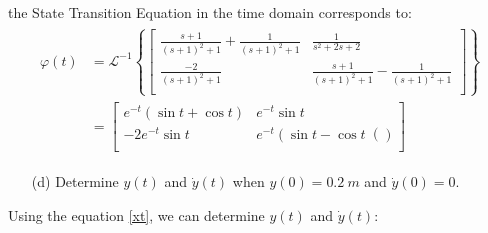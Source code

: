 \documentclass{article}
\begin{document}
the State Transition Equation in the time domain corresponds to:
\begin{eqnarray*}
\begin{split}
\varphi(t) &= \mathcal{L}^{-1} \left\lbrace
\begin{bmatrix}
    \frac{s+1}{\left(s+1\right)^2+1}+\frac{1}{\left(s+1\right)^2+1} & \frac{1}{s^2+ 2s+ 2}	\\
    \frac{-2}{\left(s+1\right)^2+1}  & \frac{s+1}{\left(s+1\right)^2+1}-\frac{1}{\left(s+1\right)^2+1} \\
\end{bmatrix} \right\rbrace \\
&= 
\begin{bmatrix}
e^{-t}\left(\sin t + \cos t \right) &  e^{-t}\sin t \\ 
-2e^{-t}\sin t &  e^{-t}\left(\sin t - \cos t \right() \\ 
\end{bmatrix}
\end{split}
\end{eqnarray*} 
\begin{enumerate}[label=(\alpha*)]
\item[(d)] Determine $y(t)$ and $\dot y(t)$ when $y(0) = 0.2 \: m $ and $\dot y(0) = 0$.
\end{enumerate}

Using the equation \ref{xt}, we can determine $y(t)$ and $\dot y(t)$:
\end{document}
